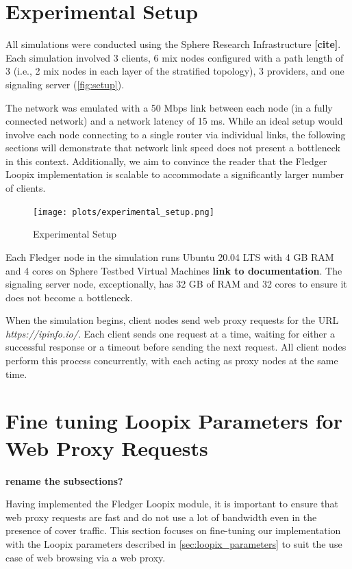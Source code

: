\documentclass[a4paper,11pt,oneside]{report}
\begin{document}
\section{Experimental Setup}
All simulations were conducted using the Sphere Research Infrastructure \textbf{[cite]}. Each simulation involved 3 clients, 6 mix nodes configured with a path length of 3 (i.e., 2 mix nodes in each layer of the stratified topology), 3 providers, and one signaling server (\autoref{fig:setup}).

The network was emulated with a 50 Mbps link between each node (in a fully connected network) and a network latency of 15 ms. While an ideal setup would involve each node connecting to a single router via individual links, the following sections will demonstrate that network link speed does not present a bottleneck in this context. Additionally, we aim to convince the reader that the Fledger Loopix implementation is scalable to accommodate a significantly larger number of clients.

\begin{figure}[H]
    \centering
    \texttt{[image: plots/experimental\_setup.png]}
    \caption{Experimental Setup}
    \label{fig:setup}
\end{figure}


Each Fledger node in the simulation runs Ubuntu 20.04 LTS with 4 GB RAM and 4 cores on Sphere Testbed Virtual Machines \textbf{link to documentation}. The signaling server node, exceptionally, has 32 GB of RAM and 32 cores to ensure it does not become a bottleneck.

When the simulation begins, client nodes send web proxy requests for the URL \textit{https://ipinfo.io/}. Each client sends one request at a time, waiting for either a successful response or a timeout before sending the next request. All client nodes perform this process concurrently, with each acting as proxy nodes at the same time.

\section{Fine tuning Loopix Parameters for Web Proxy Requests}
\label{sec:finetune}

\textbf{rename the subsections?}

Having implemented the Fledger Loopix module, it is important to ensure that web proxy requests are fast and do not use a lot of bandwidth even in the presence of cover traffic. This section focuses on fine-tuning our implementation with the Loopix parameters described in \autoref{sec:loopix_parameters} to suit the use case of web browsing via a web proxy.
\end{document}
